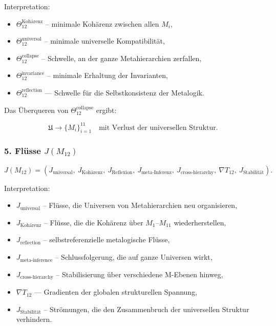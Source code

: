 Interpretation:

\begin{itemize}
    \item $\Theta_{12}^{\mathrm{Kohärenz}}$ – minimale Kohärenz zwischen allen $M_i$,
    \item $\Theta_{12}^{\mathrm{universal}}$ – minimale universelle Kompatibilität,
    \item $\Theta_{12}^{\mathrm{collapse}}$ – Schwelle, an der ganze Metahierarchien zerfallen,
    \item $\Theta_{12}^{\mathrm{invariance}}$ – minimale Erhaltung der Invarianten,
    \item $\Theta_{12}^{\mathrm{reflection}}$ — Schwelle für die Selbstkonsistenz der Metalogik.
\end{itemize}

Das Überqueren von $\Theta_{12}^{\mathrm{collapse}}$ ergibt:

\[
\mathfrak{U} \to \{ M_i \}_{i=1}^{11}
\quad\text{mit Verlust der universellen Struktur}.
\]

\subsubsection*{5. Flüsse $J(M_{12})$}

\[
J(M_{12})=
(
J_{\mathrm{universal}},\
J_{\mathrm{Kohärenz}},\
J_{\mathrm{Reflexion}},\
J_{\mathrm{meta\mbox{-}Inferenz}},\
J_{\mathrm{cross\mbox{-}hierarchy}},\
\nabla T_{12},\
J_{\mathrm{Stabilität}}
).
\]

Interpretation:

\begin{itemize}
    \item $J_{\mathrm{universal}}$ – Flüsse, die Universen von Metahierarchien neu organisieren,
    \item $J_{\mathrm{Kohärenz}}$ – Flüsse, die die Kohärenz über $M_1$–$M_{11}$ wiederherstellen,
    \item $J_{\mathrm{reflection}}$ – selbstreferenzielle metalogische Flüsse,
    \item $J_{\mathrm{meta\mbox{-}inference}}$ – Schlussfolgerung, die auf ganze Universen wirkt,
    \item $J_{\mathrm{cross\mbox{-}hierarchy}}$ – Stabilisierung über verschiedene M-Ebenen hinweg,
    \item $\nabla T_{12}$ — Gradienten der globalen strukturellen Spannung,
    \item $J_{\mathrm{Stabilität}}$ – Strömungen, die den Zusammenbruch der universellen Struktur verhindern.
\end{itemize}

